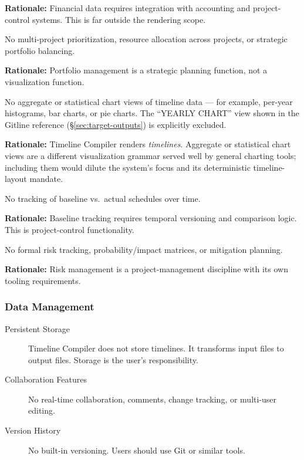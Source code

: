 \begin{description}
  \textbf{Rationale:} Financial data requires integration with accounting and project-control systems. This is far outside the rendering scope.
  
  \item[Portfolio Optimization] No multi-project prioritization, resource allocation across projects, or strategic portfolio balancing.
  
  \textbf{Rationale:} Portfolio management is a strategic planning function, not a visualization function.
  
  \item[Non-Timeline Chart Views] No aggregate or statistical chart views of timeline data --- for example, per-year histograms, bar charts, or pie charts. The ``YEARLY CHART'' view shown in the Gitline reference (\S\ref{sec:target-outputs}) is explicitly excluded.
  
  \textbf{Rationale:} Timeline Compiler renders \emph{timelines}. Aggregate or statistical chart views are a different visualization grammar served well by general charting tools; including them would dilute the system's focus and its deterministic timeline-layout mandate.
  
  \item[Baseline Comparison] No tracking of baseline vs.\ actual schedules over time.
  
  \textbf{Rationale:} Baseline tracking requires temporal versioning and comparison logic. This is project-control functionality.
  
  \item[Risk Registers] No formal risk tracking, probability/impact matrices, or mitigation planning.
  
  \textbf{Rationale:} Risk management is a project-management discipline with its own tooling requirements.
\end{description}

\subsubsection{Data Management}

\begin{description}
  \item[Persistent Storage] Timeline Compiler does not store timelines. It transforms input files to output files. Storage is the user's responsibility.
  
  \item[Collaboration Features] No real-time collaboration, comments, change tracking, or multi-user editing.
  
  \item[Version History] No built-in versioning. Users should use Git or similar tools.
\end{description}

